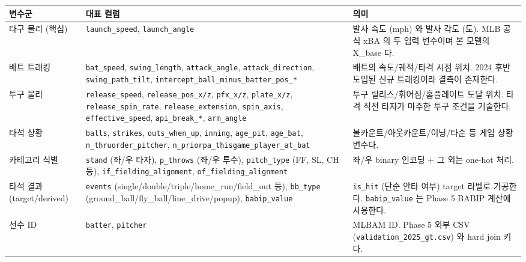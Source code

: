 \documentclass[
  11.5pt,
]{article}
\begin{document}
\begin{longtable}[]{@{}
  >{\raggedright\arraybackslash}p{}
  >{\raggedright\arraybackslash}p{}
  >{\raggedright\arraybackslash}p{}@{}}
\toprule\noalign{}
\begin{minipage}[b]{\linewidth}\raggedright
변수군
\end{minipage} & \begin{minipage}[b]{\linewidth}\raggedright
대표 컬럼
\end{minipage} & \begin{minipage}[b]{\linewidth}\raggedright
의미
\end{minipage} \\
\midrule\noalign{}
\endhead
\bottomrule\noalign{}
\endlastfoot
타구 물리 (핵심) & \texttt{launch\_speed}, \texttt{launch\_angle} & 발사
속도 (mph) 와 발사 각도 (도). MLB 공식 xBA 의 두 입력 변수이며 본 모델의
X\_base 다. \\
배트 트래킹 & \texttt{bat\_speed}, \texttt{swing\_length},
\texttt{attack\_angle}, \texttt{attack\_direction},
\texttt{swing\_path\_tilt},
\texttt{intercept\_ball\_minus\_batter\_pos\_*} & 배트의 속도/궤적/타격
시점 위치. 2024 후반 도입된 신규 트래킹이라 결측이 존재한다. \\
투구 물리 & \texttt{release\_speed}, \texttt{release\_pos\_x/z},
\texttt{pfx\_x/z}, \texttt{plate\_x/z}, \texttt{release\_spin\_rate},
\texttt{release\_extension}, \texttt{spin\_axis},
\texttt{effective\_speed}, \texttt{api\_break\_*}, \texttt{arm\_angle} &
투구 릴리스/휘어짐/홈플레이트 도달 위치. 타격 직전 타자가 마주한 투구
조건을 기술한다. \\
타석 상황 & \texttt{balls}, \texttt{strikes}, \texttt{outs\_when\_up},
\texttt{inning}, \texttt{age\_pit}, \texttt{age\_bat},
\texttt{n\_thruorder\_pitcher},
\texttt{n\_priorpa\_thisgame\_player\_at\_bat} &
볼카운트/아웃카운트/이닝/타순 등 게임 상황 변수다. \\
카테고리 식별 & \texttt{stand} (좌/우 타자), \texttt{p\_throws} (좌/우
투수), \texttt{pitch\_type} (FF, SL, CH 등),
\texttt{if\_fielding\_alignment}, \texttt{of\_fielding\_alignment} &
좌/우 binary 인코딩 + 그 외는 one-hot 처리. \\
타석 결과 (target/derived) & \texttt{events}
(single/double/triple/home\_run/field\_out 등), \texttt{bb\_type}
(ground\_ball/fly\_ball/line\_drive/popup), \texttt{babip\_value} &
\texttt{is\_hit} (단순 안타 여부) target 라벨로 가공한다.
\texttt{babip\_value} 는 Phase 5 BABIP 계산에 사용한다. \\
선수 ID & \texttt{batter}, \texttt{pitcher} & MLBAM ID. Phase 5 외부 CSV
(\texttt{validation\_2025\_gt.csv}) 와 hard join 키다. \\
\end{longtable}
\end{document}
